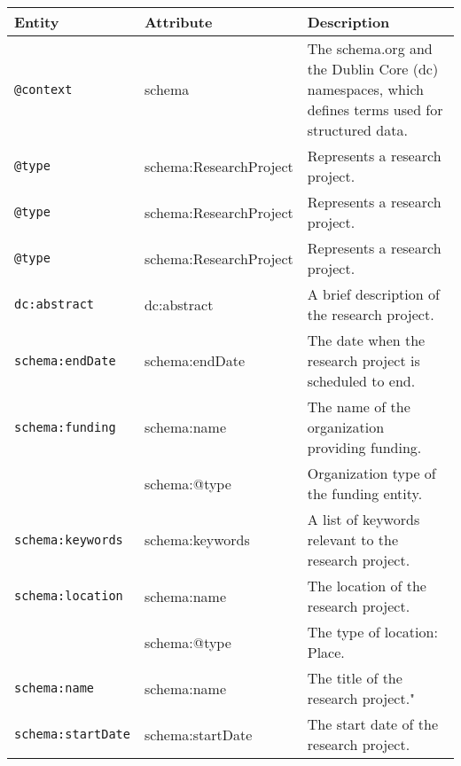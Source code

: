 \documentclass{article}
\begin{document}
\begin{longtable}{|l|l|p{8cm}|}
\hline
\textbf{Entity} & \textbf{Attribute} & \textbf{Description} \\
\hline
\texttt{@context} & schema & The schema.org and the Dublin Core (dc) namespaces, which defines terms used for structured data. \\
\hline
\texttt{@type} & schema:ResearchProject & Represents a research project. \\
\hline
\texttt{@type} & schema:ResearchProject & Represents a research project. \\
\hline
\texttt{@type} & schema:ResearchProject & Represents a research project. \\
\hline
\texttt{dc:abstract} & dc:abstract & A brief description of the research project. \\
\hline
\texttt{schema:endDate} & schema:endDate & The date when the research project is scheduled to end. \\
\hline
\texttt{schema:funding} & schema:name & The name of the organization providing funding. \\
                         & schema:@type & Organization type of the funding entity. \\
\hline
\texttt{schema:keywords} & schema:keywords & A list of keywords relevant to the research project. \\
\hline
\texttt{schema:location} & schema:name & The location of the research project. \\
                         & schema:@type & The type of location: Place. \\
\hline
\texttt{schema:name} & schema:name & The title of the research project." \\
\hline
\texttt{schema:startDate} & schema:startDate & The start date of the research project. \\
\hline
\end{longtable}
\end{document}
